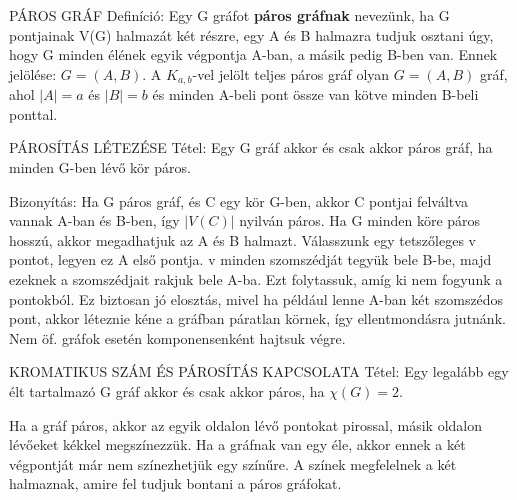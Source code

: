 \begin{shaded}
PÁROS GRÁF Definíció: Egy G gráfot \textbf{páros gráfnak} nevezünk, ha G pontjainak V(G) halmazát két részre, egy A és B halmazra tudjuk osztani úgy, hogy G minden élének egyik végpontja A-ban, a másik pedig B-ben van. Ennek jelölése: $G = (A,B)$. A $K_{a,b}$-vel jelölt teljes páros gráf olyan $G=(A,B)$ gráf, ahol $|A| = a$ és $|B| = b$ és minden A-beli pont össze van kötve minden B-beli ponttal.
\end{shaded}
\begin{framed}
PÁROSÍTÁS LÉTEZÉSE Tétel: Egy G gráf akkor és csak akkor páros gráf, ha minden G-ben lévő kör páros.
\end{framed}
\begin{leftbar}
Bizonyítás: Ha G páros gráf, és C egy kör G-ben, akkor C pontjai felváltva vannak A-ban és B-ben, így $|V(C)|$ nyilván páros. Ha G minden köre páros hosszú, akkor megadhatjuk az A és B halmazt. Válasszunk egy tetszőleges v pontot, legyen ez A első pontja.  v minden szomszédját tegyük bele B-be, majd ezeknek a szomszédjait rakjuk bele A-ba. Ezt folytassuk, amíg ki nem fogyunk a pontokból. Ez biztosan jó elosztás, mivel ha például lenne A-ban két szomszédos pont, akkor léteznie kéne a gráfban páratlan körnek, így ellentmondásra jutnánk. Nem öf. gráfok esetén komponensenként hajtsuk végre.
\end{leftbar}
\begin{framed}
KROMATIKUS SZÁM ÉS PÁROSÍTÁS KAPCSOLATA Tétel: Egy legalább egy élt tartalmazó G gráf akkor és csak akkor páros, ha $\chi(G) = 2$.
\end{framed}
\begin{leftbar}
Ha a gráf páros, akkor az egyik oldalon lévő pontokat pirossal, másik oldalon lévőeket kékkel megszínezzük. Ha a gráfnak van egy éle, akkor ennek a két végpontját már nem színezhetjük egy színűre. A színek megfelelnek a két halmaznak, amire fel tudjuk bontani a páros gráfokat.
\end{leftbar}
